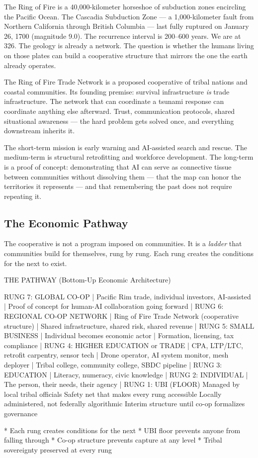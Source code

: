 \documentclass[11pt,letterpaper]{article}
\begin{document}
The Ring of Fire is a 40,000-kilometer horseshoe of subduction zones encircling the Pacific Ocean. The Cascadia Subduction Zone --- a 1,000-kilometer fault from Northern California through British Columbia --- last fully ruptured on January 26, 1700 (magnitude 9.0). The recurrence interval is 200--600 years. We are at 326. The geology is already a network. The question is whether the humans living on those plates can build a cooperative structure that mirrors the one the earth already operates.

The Ring of Fire Trade Network is a proposed cooperative of tribal nations and coastal communities. Its founding premise: survival infrastructure \emph{is} trade infrastructure. The network that can coordinate a tsunami response can coordinate anything else afterward. Trust, communication protocols, shared situational awareness --- the hard problem gets solved once, and everything downstream inherits it.

The short-term mission is early warning and AI-assisted search and rescue. The medium-term is structural retrofitting and workforce development. The long-term is a proof of concept: demonstrating that AI can serve as connective tissue between communities without dissolving them --- that the map can honor the territories it represents --- and that remembering the past does not require repeating it.

\subsection{The Economic Pathway}

The cooperative is not a program imposed on communities. It is a \emph{ladder} that communities build for themselves, rung by rung. Each rung creates the conditions for the next to exist.

\begin{asciibox}
  THE PATHWAY (Bottom-Up Economic Architecture)

  RUNG 7: GLOBAL CO-OP
  |  Pacific Rim trade, individual investors, AI-assisted
  |  Proof of concept for human-AI collaboration going forward
  |
  RUNG 6: REGIONAL CO-OP NETWORK
  |  Ring of Fire Trade Network (cooperative structure)
  |  Shared infrastructure, shared risk, shared revenue
  |
  RUNG 5: SMALL BUSINESS
  |  Individual becomes economic actor
  |  Formation, licensing, tax compliance
  |
  RUNG 4: HIGHER EDUCATION or TRADE
  |  CPA, LTP/LTC, retrofit carpentry, sensor tech
  |  Drone operator, AI system monitor, mesh deployer
  |  Tribal college, community college, SBDC pipeline
  |
  RUNG 3: EDUCATION
  |  Literacy, numeracy, civic knowledge
  |
  RUNG 2: INDIVIDUAL
  |  The person, their needs, their agency
  |
  RUNG 1: UBI (FLOOR)
     Managed by local tribal officials
     Safety net that makes every rung accessible
     Locally administered, not federally algorithmic
     Interim structure until co-op formalizes governance

  * Each rung creates conditions for the next
  * UBI floor prevents anyone from falling through
  * Co-op structure prevents capture at any level
  * Tribal sovereignty preserved at every rung
\end{asciibox}
\end{document}
